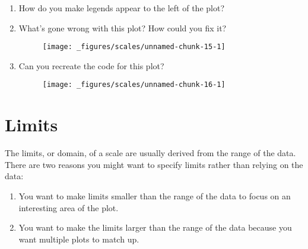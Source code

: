 \begin{enumerate}
\def\labelenumi{\arabic{enumi}.}
\item
  How do you make legends appear to the left of the plot?
\item
  What's gone wrong with this plot? How could you fix it?

\begin{Shaded}
\begin{Highlighting}[]
\OperatorTok{+}\StringTok{ }
\StringTok{  }\NormalTok{(}\NormalTok{(}\OperatorTok{+}\StringTok{ }
\StringTok{  }\NormalTok{(}\NormalTok{)}
\end{Highlighting}
\end{Shaded}

  \begin{figure}[H]
    \centering
    \texttt{[image: \_figures/scales/unnamed-chunk-15-1]}
  \end{figure}
\item
  Can you recreate the code for this plot?

  \begin{figure}[H]
    \centering
    \texttt{[image: \_figures/scales/unnamed-chunk-16-1]}
  \end{figure}
\end{enumerate}

\hypertarget{sec:limits}{%
\section{Limits}\label{sec:limits}}

The limits, or domain, of a scale are usually derived from the range of
the data.   There are two
reasons you might want to specify limits rather than relying on the
data:

\begin{enumerate}
\def\labelenumi{\arabic{enumi}.}
\item
  You want to make limits smaller than the range of the data to focus on
  an interesting area of the plot.
\item
  You want to make the limits larger than the range of the data because
  you want multiple plots to match up.
\end{enumerate}


